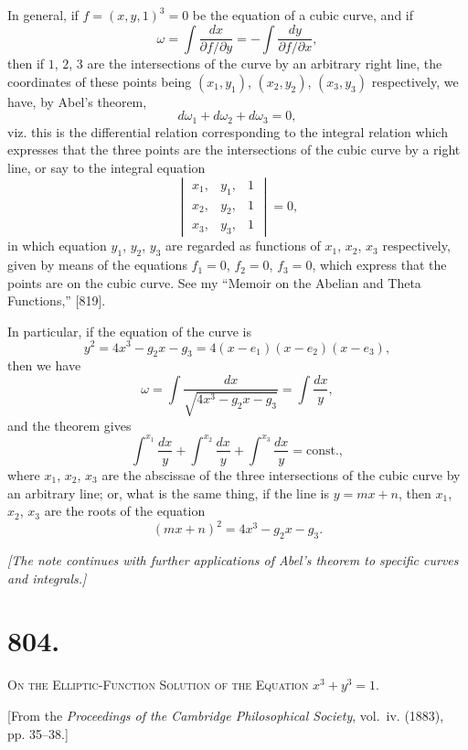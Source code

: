 \documentclass[11pt,a4paper]{article}
\theoremstyle{definition}
\theoremstyle{remark}
\begin{document}
In general, if $f = (x, y, 1)^3 = 0$ be the equation of a cubic curve, and if
\[
\omega = \int \frac{dx}{\partial f / \partial y} = -\int \frac{dy}{\partial f / \partial x},
\]
then if $1$, $2$, $3$ are the intersections of the curve by an arbitrary right line, the coordinates of these points being $(x_1, y_1)$, $(x_2, y_2)$, $(x_3, y_3)$ respectively, we have, by Abel's theorem,
\[
d\omega_1 + d\omega_2 + d\omega_3 = 0,
\]
viz. this is the differential relation corresponding to the integral relation which expresses that the three points are the intersections of the cubic curve by a right line, or say to the integral equation
\[
\begin{vmatrix}
x_1, & y_1, & 1 \\
x_2, & y_2, & 1 \\
x_3, & y_3, & 1
\end{vmatrix} = 0,
\]
in which equation $y_1$, $y_2$, $y_3$ are regarded as functions of $x_1$, $x_2$, $x_3$ respectively, given by means of the equations $f_1 = 0$, $f_2 = 0$, $f_3 = 0$, which express that the points are on the cubic curve. See my ``Memoir on the Abelian and Theta Functions,'' [819].

In particular, if the equation of the curve is
\[
y^2 = 4x^3 - g_2 x - g_3 = 4(x - e_1)(x - e_2)(x - e_3),
\]
then we have
\[
\omega = \int \frac{dx}{\sqrt{4x^3 - g_2 x - g_3}} = \int \frac{dx}{y},
\]
and the theorem gives
\[
\int^{x_1} \frac{dx}{y} + \int^{x_2} \frac{dx}{y} + \int^{x_3} \frac{dx}{y} = \text{const.},
\]
where $x_1$, $x_2$, $x_3$ are the abscissae of the three intersections of the cubic curve by an arbitrary line; or, what is the same thing, if the line is $y = mx + n$, then $x_1$, $x_2$, $x_3$ are the roots of the equation
\[
(mx + n)^2 = 4x^3 - g_2 x - g_3.
\]

\vspace{0.5cm}
\noindent\textit{[The note continues with further applications of Abel's theorem to specific curves and integrals.]}
\vspace{0.5cm}



\newpage
\section*{804.}
\begin{center}
{\large\scshape On the Elliptic-Function Solution of the Equation $x^3 + y^3 = 1$.}
\end{center}

\begin{flushright}
\small[From the \textit{Proceedings of the Cambridge Philosophical Society}, vol.~iv. (1883),\\
pp. 35--38.]
\end{flushright}
\end{document}
